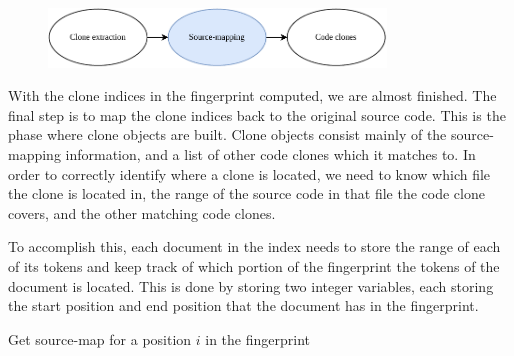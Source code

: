 \begin{figure}[H]
    \begin{center}
        \includegraphics[width=0.8\textwidth]{figures/phases/phases_sourcemap.drawio.pdf}
    \end{center}
\end{figure}

With the clone indices in the fingerprint computed, we are almost finished. The final step
is to map the clone indices back to the original source code. This is the phase where
clone objects are built. Clone objects consist mainly of the source-mapping information,
and a list of other code clones which it matches to. In order to correctly identify where
a clone is located, we need to know which file the clone is located in, the range of the
source code in that file the code clone covers, and the other matching code clones.

To accomplish this, each document in the index needs to store the range of each of its
tokens and keep track of which portion of the fingerprint the tokens of the document is
located. This is done by storing two integer variables, each storing the start position
and end position that the document has in the fingerprint. 

\begin{algorithm}[t]
  \SetAlgoLined\DontPrintSemicolon

  \vspace{0.5cm}
  \caption{Get source-map for a position $i$ in the fingerprint}
  \label{alg:sourcemap}
\end{algorithm}

